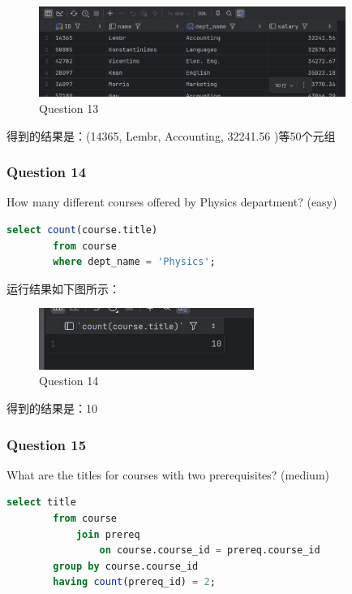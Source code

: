 \documentclass{article}
\begin{document}
    \begin{figure}[H]
    	\centering
    	\includegraphics[width=10cm]{./images/17.Question13.png}
    	\caption{Question 13}
    \end{figure}
    
    得到的结果是：(14365, Lembr, Accounting, 32241.56
    )等50个元组
    
    \subsubsection{Question 14}
    
    How many different courses offered by Physics department? (easy)
    
    \begin{lstlisting}[language=sql, title=Question 14, tabsize=4]
    	select count(course.title)
    	from course
    	where dept_name = 'Physics';
    \end{lstlisting}
    
    运行结果如下图所示：
    
    \begin{figure}[H]
    	\centering
    	\includegraphics[width=7cm]{./images/18.Question14.png}
    	\caption{Question 14}
    \end{figure}
    
    得到的结果是：10
    
    \subsubsection{Question 15}
    
    What are the titles for courses with two prerequisites? (medium)
    
    \begin{lstlisting}[language=sql, title=Question 15, tabsize=4] 
    	select title 
    	from course 
    		join prereq 
    			on course.course_id = prereq.course_id 
    	group by course.course_id 
    	having count(prereq_id) = 2; 
    \end{lstlisting}
    
\end{document}
